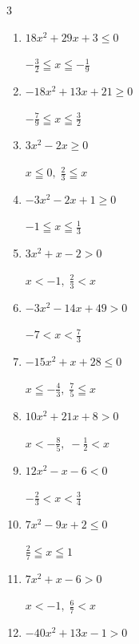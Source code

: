 \begin{multicols}{3}
\begin{enumerate}
        $\displaystyle x < -\frac{1}{3} , \; 1 < x$

\columnbreak %

\resetques

  \item $18x^{2}+29x+3\leq 0$

        $\displaystyle -\frac{3}{2} \leqq x \leqq -\frac{1}{9}$

  \item $-18x^{2}+13x+21\geq 0$

        $\displaystyle -\frac{7}{9} \leqq x \leqq \frac{3}{2}$

  \item $3x^{2}-2x\geq 0$

        $\displaystyle x \leqq 0 , \; \frac{2}{3} \leqq x$

  \item $-3x^{2}-2x+1\geq 0$

        $\displaystyle -1 \leqq x \leqq \frac{1}{3}$

  \item $3x^{2}+x-2>0$

        $\displaystyle x < -1 , \; \frac{2}{3} < x$

  \item $-3x^{2}-14x+49>0$

        $\displaystyle -7 < x < \frac{7}{3}$

  \item $-15x^{2}+x+28\leq 0$

        $\displaystyle x \leqq -\frac{4}{3} , \; \frac{7}{5} \leqq x$

  \item $10x^{2}+21x+8>0$

        $\displaystyle x < -\frac{8}{5} , \; -\frac{1}{2} < x$

  \item $12x^{2}-x-6<0$

        $\displaystyle -\frac{2}{3} < x < \frac{3}{4}$

  \item $7x^{2}-9x+2\leq 0$

        $\displaystyle \frac{2}{7} \leqq x \leqq 1$

\columnbreak %

  \item $7x^{2}+x-6>0$

        $\displaystyle x < -1 , \; \frac{6}{7} < x$

  \item $-40x^{2}+13x-1>0$


\end{enumerate}
\end{multicols}
